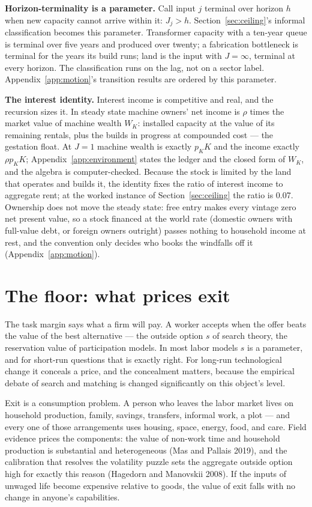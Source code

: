 \documentclass[12pt]{article}
\theoremstyle{plain}
\begin{document}
\textbf{Horizon-terminality is a parameter.} Call input $j$ terminal over horizon $h$ when new capacity cannot arrive within it: $J_j > h$. Section~\ref{sec:ceiling}'s informal classification becomes this parameter. Transformer capacity with a ten-year queue is terminal over five years and produced over twenty; a fabrication bottleneck is terminal for the years its build runs; land is the input with $J = \infty$, terminal at every horizon. The classification runs on the lag, not on a sector label. Appendix~\ref{app:motion}'s transition results are ordered by this parameter.

\textbf{The interest identity.} Interest income is competitive and real, and the recursion sizes it. In steady state machine owners' net income is $\rho$ times the market value of machine wealth $W_K$: installed capacity at the value of its remaining rentals, plus the builds in progress at compounded cost --- the gestation float. At $J = 1$ machine wealth is exactly $p_K K$ and the income exactly $\rho p_K K$; Appendix~\ref{app:environment} states the ledger and the closed form of $W_K$, and the algebra is computer-checked. Because the stock is limited by the land that operates and builds it, the identity fixes the ratio of interest income to aggregate rent; at the worked instance of Section~\ref{sec:ceiling} the ratio is 0.07. Ownership does not move the steady state: free entry makes every vintage zero net present value, so a stock financed at the world rate (domestic owners with full-value debt, or foreign owners outright) passes nothing to household income at rest, and the convention only decides who books the windfalls off it (Appendix~\ref{app:motion}).

\section{The floor: what prices exit}\label{sec:floor}

The task margin says what a firm will pay. A worker accepts when the offer beats the value of the best alternative --- the outside option $s$ of search theory, the reservation value of participation models. In most labor models $s$ is a parameter, and for short-run questions that is exactly right. For long-run technological change it conceals a price, and the concealment matters, because the empirical debate of search and matching is changed significantly on this object's level.

Exit is a consumption problem. A person who leaves the labor market lives on household production, family, savings, transfers, informal work, a plot --- and every one of those arrangements uses housing, space, energy, food, and care. Field evidence prices the components: the value of non-work time and household production is substantial and heterogeneous (Mas and Pallais 2019), and the calibration that resolves the volatility puzzle sets the aggregate outside option high for exactly this reason (Hagedorn and Manovskii 2008). If the inputs of unwaged life become expensive relative to goods, the value of exit falls with no change in anyone's capabilities.
\end{document}
